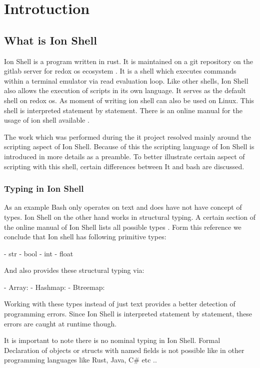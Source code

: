 \chapter{Introtuction}\label{ch:intro}

\section{What is Ion Shell}

Ion Shell is a program written in rust.
It is maintained on a git repository on the gitlab server for redox os ecosystem \cite{ion_shell}.
It is a shell which executes commands within a terminal emulator via read evaluation loop.
Like other shells, Ion Shell also allows the execution of scripts in its own language.
It serves as the default shell on redox os.
As moment of writing ion shell can also be used on Linux.
This shell is interpreted statement by statement.
There is an online manual for the usage of ion shell available \cite{ion_shell_online_manual}.

The work which was performed during the it project resolved mainly around the scripting aspect of Ion Shell.
Because of this the scripting language of Ion Shell is introduced in more details as a preamble.
To better illustrate certain aspect of scripting with this shell, certain differences between It and bash are discussed.

\subsection{Typing in Ion Shell}

As an example Bash only operates on text and does have not have concept of types.
Ion Shell on the other hand works in structural typing.
A certain section of the online manual of Ion Shell lists all possible types \cite{ion_shell_types}.
Form this reference we conclude that Ion shell has following primitive types:

- str
- bool
- int
- float

And also provides these structural typing via:

- Array:
- Hashmap:
- Btreemap:

Working with these types instead of just text provides a better detection of programming errors.
Since Ion Shell is interpreted statement by statement, these errors are caught at runtime though.

It is important to note there is no nominal typing in Ion Shell.
Formal Declaration of objects or structs with named fields is not possible like in other programming languages like Rust, Java, C\# etc ..


